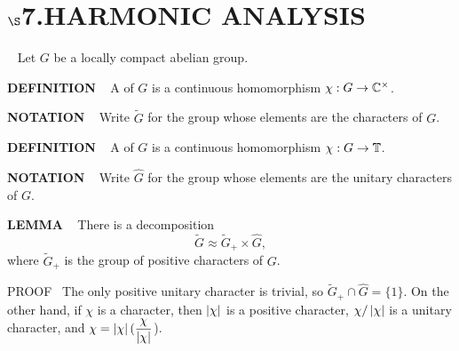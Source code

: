 \chapter{
$\boldsymbol{\S}$\textbf{7}.\quad  HARMONIC ANALYSIS}
\setlength\parindent{2em}
\setcounter{theoremn}{0}

\ \indent 
Let $G$ be a locally compact abelian group.

\vspace{0.25cm}

\begin{x}{\small\bf DEFINITION} \ %
A 
of $G$ is a continuous homomorphism $\chi:G \rightarrow \mathbb{C}^\times$.
\end{x}

\vspace{0.1cm}

\begin{x}{\small\bf NOTATION} \ %
Write $\widetilde{G}$ for the group whose elements are the characters of $G$.
\end{x}

\vspace{0.1cm}

\begin{x}{\small\bf DEFINITION} \ %
A 
of $G$ is a continuous homomorphism $\chi: G \rightarrow \mathbb{T}$.
\end{x}

\vspace{0.1cm}

\begin{x}{\small\bf NOTATION} \ %
Write $\widehat{G}$ for the group whose elements are the unitary characters of $G$.
\end{x}

\vspace{0.1cm}


\begin{x}{\small\bf LEMMA} \ %
There is a decomposition
\[
\widetilde{G} \approx \widetilde{G}_+ \times \widehat{G},
\]
where $\widetilde{G}_+$ is the group of positive characters of $G$.

\vspace{0.1cm}

PROOF \  The only positive unitary character is trivial, so $\widetilde{G}_+ \cap \widehat{G} = \{1\}$.  On the other hand, if $\chi$ is a character, then $\left\vert\chi\right\vert$ is a positive character, $\chi / \left\vert\chi\right\vert$ is a unitary character, and $\chi = \left\vert\chi\right\vert (\displaystyle\frac{\chi}{\left\vert\chi\right\vert}$).
\end{x}

